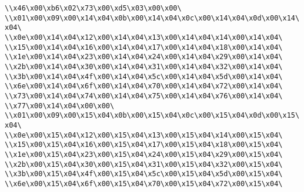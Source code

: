 \verb|\\x46\x00\xb6\x02\x73\x00\xd5\x03\x00\x00\|\newline
\verb|\\x01\x00\x09\x00\x14\x04\x0b\x00\x14\x04\x0c\x00\x14\x04\x0d\x00\x14\x04\|\newline
\verb|\\x0e\x00\x14\x04\x12\x00\x14\x04\x13\x00\x14\x04\x14\x00\x14\x04\|\newline
\verb|\\x15\x00\x14\x04\x16\x00\x14\x04\x17\x00\x14\x04\x18\x00\x14\x04\|\newline
\verb|\\x1e\x00\x14\x04\x23\x00\x14\x04\x24\x00\x14\x04\x29\x00\x14\x04\|\newline
\verb|\\x2b\x00\x14\x04\x30\x00\x14\x04\x31\x00\x14\x04\x32\x00\x14\x04\|\newline
\verb|\\x3b\x00\x14\x04\x4f\x00\x14\x04\x5c\x00\x14\x04\x5d\x00\x14\x04\|\newline
\verb|\\x6e\x00\x14\x04\x6f\x00\x14\x04\x70\x00\x14\x04\x72\x00\x14\x04\|\newline
\verb|\\x73\x00\x14\x04\x74\x00\x14\x04\x75\x00\x14\x04\x76\x00\x14\x04\|\newline
\verb|\\x77\x00\x14\x04\x00\x00\|\newline
\verb|\\x01\x00\x09\x00\x15\x04\x0b\x00\x15\x04\x0c\x00\x15\x04\x0d\x00\x15\x04\|\newline
\verb|\\x0e\x00\x15\x04\x12\x00\x15\x04\x13\x00\x15\x04\x14\x00\x15\x04\|\newline
\verb|\\x15\x00\x15\x04\x16\x00\x15\x04\x17\x00\x15\x04\x18\x00\x15\x04\|\newline
\verb|\\x1e\x00\x15\x04\x23\x00\x15\x04\x24\x00\x15\x04\x29\x00\x15\x04\|\newline
\verb|\\x2b\x00\x15\x04\x30\x00\x15\x04\x31\x00\x15\x04\x32\x00\x15\x04\|\newline
\verb|\\x3b\x00\x15\x04\x4f\x00\x15\x04\x5c\x00\x15\x04\x5d\x00\x15\x04\|\newline
\verb|\\x6e\x00\x15\x04\x6f\x00\x15\x04\x70\x00\x15\x04\x72\x00\x15\x04\|\newline
